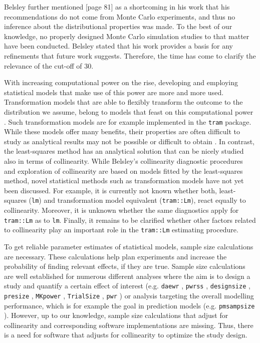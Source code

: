 \documentclass[11pt,a4paper,twoside]{book}\usepackage[]{graphicx}\usepackage[]{xcolor}
\begin{document}
Belsley further mentioned \citep{Belsley1991}[page 81] as a shortcoming in his work that his recommendations do not come from Monte Carlo experiments, and thus no inference about the distributional properties was made.
To the best of our knowledge, no properly designed Monte Carlo simulation studies \citep{Burton2006, Morris2019, pawel2022} to that matter have been conducted.
Belsley stated that his work provides a basis for any refinements that future work suggests.
Therefore, the time has come to clarify the relevance of the cut-off of 30.


With increasing computational power on the rise, developing and employing statistical models that make use of this power are more and more used. Transformation models that are able to flexibly transform the outcome to the distribution we assume, belong to models that feast on this computational power \citep{Hothorn2017, Hothorn2020, Siegfried2020}.
Such transformation models are for example implemented in the \texttt{tram} package.
While these models offer many benefits, their properties are often difficult to study as analytical results may not be possible or difficult to obtain \citep{Morris2019, Boulesteix2020}.
In contrast, the least-squares method has an analytical solution that can be nicely studied also in terms of collinearity.
While Belsley's collinearity diagnostic procedures and exploration of collinearity are based on models fitted by the least-squares method, novel statistical methods such as transformation models have not yet been discussed.
For example, it is currently not known whether both, least-squares (\texttt{lm}) and transformation model equivalent (\texttt{tram::Lm}), react equally to collinearity.
Moreover, it is unknown whether the same diagnostics apply for \texttt{tram::Lm} as to \texttt{lm}.
Finally, it remains to be clarified whether other factors related to collinearity play an important role in the \texttt{tram::Lm} estimating procedure.

To get reliable parameter estimates of statistical models, sample size calculations are necessary.
These calculations help plan experiments and increase the probability of finding relevant effects, if they are true.
Sample size calculations are well established for numerous different analyses where the aim is to design a study and quantify a certain effect of interest (e.g. \texttt{daewr} \cite{daewr},
 \texttt{pwrss} \cite{pwrss},
 \texttt{designsize} \cite{designsize},
 \texttt{presize} \cite{presize},
 \texttt{MKpower} \cite{MKpower},
 \texttt{TrialSize} \cite{TrialSize},
 \texttt{pwr} \cite{pwr}) or analysis targeting the overall modelling performance, which is for example the goal in prediction models (e.g. \texttt{pmsampsize} \cite{pmsampsize}).
However, up to our knowledge, sample size calculations that adjust for collinearity and corresponding software implementations are missing. Thus, there is a need for software that adjusts for collinearity to optimize the study design. 
\end{document}
